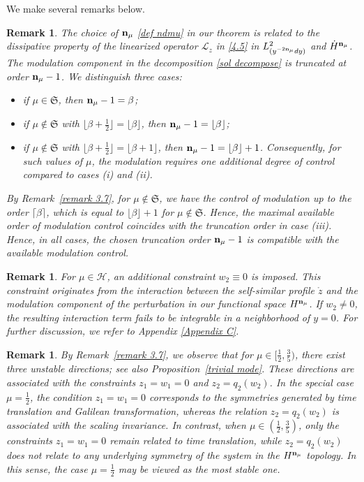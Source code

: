 \documentclass{article}
\def\lz{\mathcal L_z}
\def\ssmu{\mathfrak S}
\def\ndmu{{\bf{n}_{\mu}}}
\numberwithin{equation}{section}
\newtheorem{remark}[theorem]{Remark}
\begin{document}
We make several remarks below. 

\begin{remark} The choice of $\ndmu$ \eqref{def ndmu} in our theorem is related to the dissipative property of the linearized operator $\lz$ in \eqref{4.5} in $L^2_{(y^{-2\ndmu}dy)}$ and $\dot H^\ndmu$. The modulation component in the decomposition \eqref{sol decompose} is truncated at order $\ndmu-1$. We distinguish three cases:
\begin{itemize}
    \item[(i)] if $\mu\in\ssmu$, then $\ndmu-1= \beta$;
    \item[(ii)] if $\mu\notin\ssmu$ with $ \lfloor \beta+\frac12\rfloor=\lfloor \beta\rfloor $, then $\ndmu-1 = \lfloor \beta\rfloor$;
    \item[(iii)] if $\mu\notin\ssmu$ with $ \lfloor \beta+\frac12\rfloor = \lfloor \beta+1\rfloor $, then $\ndmu-1 =\lfloor \beta\rfloor+1$. Consequently, for such values of $\mu$, the modulation requires one additional degree of control compared to cases (i) and (ii). 
\end{itemize}
By Remark~\ref{remark 3.7}, for $\mu\notin\ssmu$, we have the control of modulation up to the order $\lceil \beta\rceil$, which is equal to $\lfloor \beta\rfloor+1$ for $\mu\notin \ssmu$. Hence, the maximal available order of modulation control coincides with the truncation order in case (iii). Hence, in all cases, the chosen truncation order $\ndmu-1$ is compatible with the available modulation control. 
\end{remark}
\begin{remark}
    For $\mu\in \mathcal H$, an additional constraint $w_2\equiv 0$ is imposed.  This constraint originates from the interaction between the self-similar profile $\mathring z$ and the modulation component of the perturbation in our functional space $H^\ndmu$. If $w_2\neq 0$, %
    the resulting interaction term fails to be integrable in a neighborhood of $y=0$. For further discussion, we refer to Appendix \ref{Appendix C}. 
    \end{remark}


  

\begin{remark}\label{remark 2.10}
    By Remark~\ref{remark 3.7}, we observe that for $\mu\in[\frac12,\frac{3}{5})$, there exist three unstable directions; see also Proposition~\ref{trivial mode}. These directions are associated with the constraints $z_1=w_1=0$ and $z_2=q_2(w_2)$. 
    In the special case $\mu=\frac12$, the condition $z_1=w_1=0$ corresponds to the symmetries generated by time translation and Galilean transformation, whereas the relation $z_2=q_2(w_2)$ is associated with the scaling invariance. In contrast, when $\mu\in(\frac12,\frac{3}{5})$, only the constraints $z_1=w_1=0$ remain related to time translation, while $z_2=q_2(w_2)$ does not relate to any underlying symmetry of the system in the $H^\ndmu$ topology. In this sense, the case $\mu=\frac12$ may be viewed as the most stable one. 
\end{remark}
\end{document}
